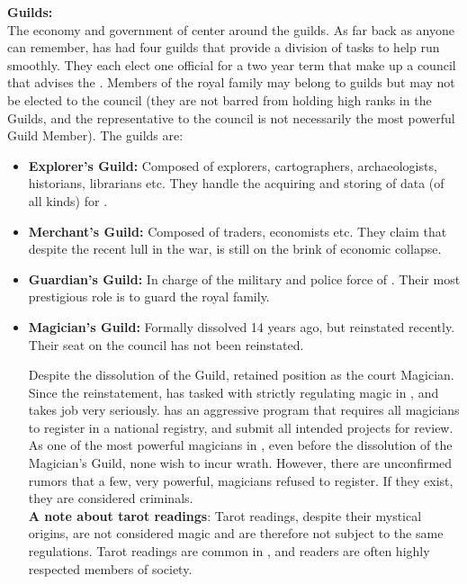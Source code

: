 \documentclass[blue]{NeptuneBall}
\begin{document}
{\bf Guilds:}\\
The economy and government of \pAtlantis{} center around the guilds. As far back as anyone can remember, \pAtlantis{} has had four guilds that provide a division of tasks to help \pAtlantis{} run smoothly. They each elect one official for a two year term that make up a council that advises the \cKing{\King}.  Members of the royal family may belong to guilds but may not be elected to the council (they are not barred from holding high ranks in the Guilds, and the representative to the council is not necessarily the most powerful Guild Member). The guilds are:
\begin{itemize}
  \item {\bf Explorer's Guild:} Composed of explorers, cartographers, archaeologists, historians, librarians etc. They handle the acquiring and storing of data (of all kinds) for \pAtlantis{}.
  \item{\bf Merchant's Guild:} Composed of traders, economists etc. They claim that despite the recent lull in the war, \pAtlantis{} is still on the brink of economic collapse.
  \item {\bf Guardian's Guild:} In charge of the military and police force of \pAtlantis{}. Their most prestigious role is to guard the royal family.
  \item {\bf Magician's Guild:}  Formally dissolved 14 years ago, but reinstated recently. Their seat on the council has not been reinstated.
  
  Despite the dissolution of the Guild, \cManta{} retained \cManta{\their} position as the court Magician. Since the reinstatement, \cKing{} has tasked \cManta{} with strictly regulating magic in \pAtlantis{}, and \cManta{} takes \cManta{\their} job very seriously. \cManta{} has an aggressive program that requires all magicians to register in a national registry, and submit all intended projects for review. As one of the most powerful magicians in \pAtlantis{}, even before the dissolution of the Magician's Guild, none wish to incur \cManta{\their} wrath. However, there are unconfirmed rumors that a few, very powerful, magicians refused to register. If they exist, they are considered criminals.\\
  
  {\bf A note about tarot readings}: Tarot readings, despite their mystical origins, are not considered magic and are therefore not subject to the same regulations. Tarot readings are common in \pAtlantis{}, and readers are often highly respected members of society.
\end{itemize}
\end{document}
